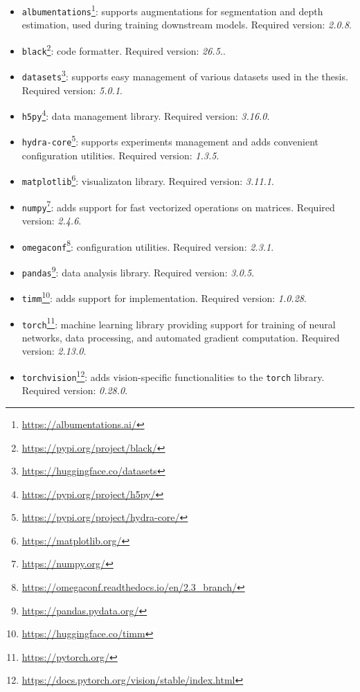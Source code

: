 \begin{itemize}
    \item \texttt{albumentations}\footnote{\url{https://albumentations.ai/}}: supports augmentations for segmentation and depth estimation, used during training downstream models. Required version: \textit{2.0.8}.
    \item \texttt{black}\footnote{\url{https://pypi.org/project/black/}}: code formatter. Required version: \textit{26.5.}.
    \item \texttt{datasets}\footnote{\url{https://huggingface.co/datasets}}: supports easy management of various datasets used in the thesis. Required version: \textit{5.0.1}.
    \item \texttt{h5py}\footnote{\url{https://pypi.org/project/h5py/}}: data management library. Required version: \textit{3.16.0}.
    \item \texttt{hydra-core}\footnote{\url{https://pypi.org/project/hydra-core/}}: supports experiments management and adds convenient configuration utilities. Required version: \textit{1.3.5}.
    \item \texttt{matplotlib}\footnote{\url{https://matplotlib.org/}}: visualizaton library. Required version: \textit{3.11.1}.
    \item \texttt{numpy}\footnote{\url{https://numpy.org/}}: adds support for fast vectorized operations on matrices. Required version: \textit{2.4.6}.
    \item \texttt{omegaconf}\footnote{\url{https://omegaconf.readthedocs.io/en/2.3_branch/}}: configuration utilities. Required version: \textit{2.3.1}.
    \item \texttt{pandas}\footnote{\url{https://pandas.pydata.org/}}: data analysis library. Required version: \textit{3.0.5}.
    \item \texttt{timm}\footnote{\url{https://huggingface.co/timm}}: adds support for \DINOvone implementation. Required version: \textit{1.0.28}.
    \item \texttt{torch}\footnote{\url{https://pytorch.org/}}: machine learning library providing support for training of neural networks, data processing, and automated gradient computation. Required version: \textit{2.13.0}.
    \item \texttt{torchvision}\footnote{\url{https://docs.pytorch.org/vision/stable/index.html}}: adds vision-specific functionalities to the \texttt{torch} library. Required version: \textit{0.28.0}.
\end{itemize}

